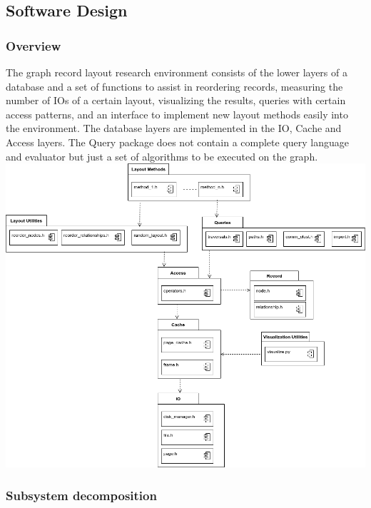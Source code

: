 \subsection{Software Design}
\subsubsection{Overview}
The graph record layout research environment consists of the lower layers of a database and a set of functions to assist in reordering records, measuring the number of IOs of a certain layout, visualizing the results, queries with certain access patterns, and an interface to implement new layout methods easily into the environment. The database layers are implemented in the IO, Cache and Access layers. The Query package does not contain a complete query language and evaluator but just a set of algorithms to be executed on the graph. \\ [2em]

\hspace{-2cm}\includegraphics[keepaspectratio,width=1.2\textwidth, height=.7\textheight]{img/overview.png}

\newpage

\subsubsection{Subsystem decomposition}
